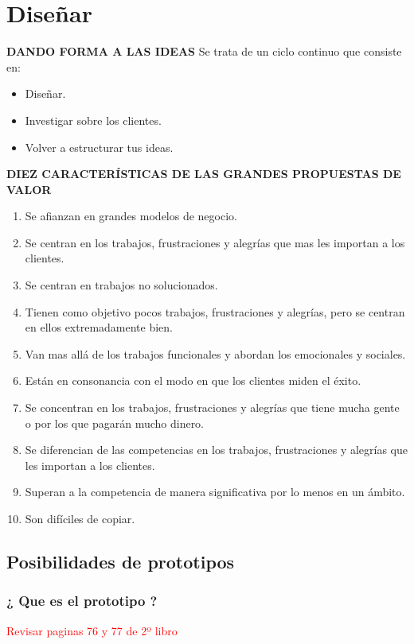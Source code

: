 \documentclass[11pt]{book}
\begin{document}
\chapter{Diseñar}
\textbf{DANDO FORMA A LAS IDEAS}
Se trata de un ciclo continuo que consiste en:
\begin{itemize}
\item Diseñar.
\item Investigar sobre los clientes.
\item Volver a estructurar tus ideas.
\end{itemize}
\textbf{DIEZ CARACTERÍSTICAS DE LAS GRANDES PROPUESTAS DE VALOR}
\begin{enumerate}
\item Se afianzan en grandes modelos de negocio.
\item Se centran en los trabajos, frustraciones y alegrías que mas les importan a los clientes.
\item Se centran en trabajos no solucionados.
\item Tienen como objetivo pocos trabajos, frustraciones y alegrías, pero se centran en ellos extremadamente bien.
\item Van mas allá de los trabajos funcionales y abordan los emocionales y sociales.
\item Están en consonancia con el modo en que los clientes miden el éxito.
\item Se concentran en los trabajos, frustraciones y alegrías que tiene mucha gente o por los que pagarán mucho dinero.
\item Se diferencian de las competencias en los trabajos, frustraciones y alegrías que les importan a los clientes.
\item Superan a la competencia de manera significativa por lo menos en un ámbito.
\item Son difíciles de copiar.
\end{enumerate}
\section{Posibilidades de prototipos}
\subsection{¿ Que es el prototipo ?}
\textcolor{red}{Revisar paginas 76 y 77 de 2º libro}
\end{document}

